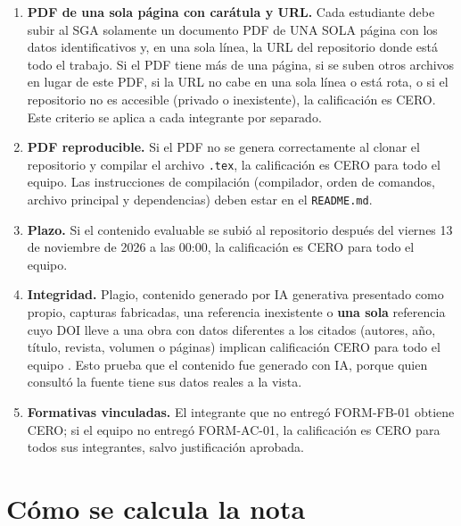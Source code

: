 \documentclass[11pt,a4paper]{article}
\begin{document}
\begin{pisoBox}[title={Su incumplimiento implica calificación CERO}]
	\begin{enumerate}[label=\textbf{P\arabic*.},leftmargin=2.2em]
		\item \textbf{PDF de una sola página con carátula y URL.} Cada estudiante debe subir al SGA solamente un documento PDF de UNA SOLA página con los datos identificativos y, en una sola línea, la URL del repositorio donde está todo el trabajo. Si el PDF tiene más de una página, si se suben otros archivos en lugar de este PDF, si la URL no cabe en una sola línea o está rota, o si el repositorio no es accesible (privado o inexistente), la calificación es CERO. Este criterio se aplica a cada integrante por separado.
		\item \textbf{PDF reproducible.} Si el PDF no se genera correctamente al clonar el repositorio y compilar el archivo \texttt{.tex}, la calificación es CERO para todo el equipo. Las instrucciones de compilación (compilador, orden de comandos, archivo principal y dependencias) deben estar en el \texttt{README.md}.
		\item \textbf{Plazo.} Si el contenido evaluable se subió al repositorio después del viernes 13 de noviembre de 2026 a las 00:00, la calificación es CERO para todo el equipo.
		\item \textbf{Integridad.} Plagio, contenido generado por IA generativa presentado como propio, capturas fabricadas, una referencia inexistente o \textbf{una sola} referencia cuyo DOI lleve a una obra con datos diferentes a los citados (autores, año, título, revista, volumen o páginas) implican calificación CERO para todo el equipo \cite{acm2018ethics}. Esto prueba que el contenido fue generado con IA, porque quien consultó la fuente tiene sus datos reales a la vista.
		\item \textbf{Formativas vinculadas.} El integrante que no entregó FORM-FB-01 obtiene CERO; si el equipo no entregó FORM-AC-01, la calificación es CERO para todos sus integrantes, salvo justificación aprobada.
	\end{enumerate}
\end{pisoBox}

\section{Cómo se calcula la nota}\label{sec:nota}
\end{document}
